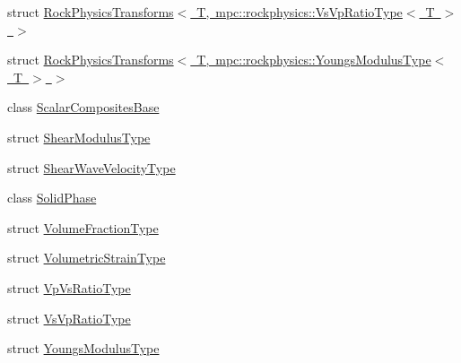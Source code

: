 \begin{DoxyCompactItemize}
\item 
struct \mbox{\hyperlink{structmpc_1_1rockphysics_1_1_rock_physics_transforms_3_01_t_00_01mpc_1_1rockphysics_1_1_vs_vp_ratio_type_3_01_t_01_4_01_4}{Rock\+Physics\+Transforms$<$ T, mpc\+::rockphysics\+::\+Vs\+Vp\+Ratio\+Type$<$ T $>$ $>$}}
\item 
struct \mbox{\hyperlink{structmpc_1_1rockphysics_1_1_rock_physics_transforms_3_01_t_00_01mpc_1_1rockphysics_1_1_youngs_modulus_type_3_01_t_01_4_01_4}{Rock\+Physics\+Transforms$<$ T, mpc\+::rockphysics\+::\+Youngs\+Modulus\+Type$<$ T $>$ $>$}}
\item 
class \mbox{\hyperlink{classmpc_1_1rockphysics_1_1_scalar_composites_base}{Scalar\+Composites\+Base}}
\item 
struct \mbox{\hyperlink{structmpc_1_1rockphysics_1_1_shear_modulus_type}{Shear\+Modulus\+Type}}
\item 
struct \mbox{\hyperlink{structmpc_1_1rockphysics_1_1_shear_wave_velocity_type}{Shear\+Wave\+Velocity\+Type}}
\item 
class \mbox{\hyperlink{classmpc_1_1rockphysics_1_1_solid_phase}{Solid\+Phase}}
\item 
struct \mbox{\hyperlink{structmpc_1_1rockphysics_1_1_volume_fraction_type}{Volume\+Fraction\+Type}}
\item 
struct \mbox{\hyperlink{structmpc_1_1rockphysics_1_1_volumetric_strain_type}{Volumetric\+Strain\+Type}}
\item 
struct \mbox{\hyperlink{structmpc_1_1rockphysics_1_1_vp_vs_ratio_type}{Vp\+Vs\+Ratio\+Type}}
\item 
struct \mbox{\hyperlink{structmpc_1_1rockphysics_1_1_vs_vp_ratio_type}{Vs\+Vp\+Ratio\+Type}}
\item 
struct \mbox{\hyperlink{structmpc_1_1rockphysics_1_1_youngs_modulus_type}{Youngs\+Modulus\+Type}}
\end{DoxyCompactItemize}
